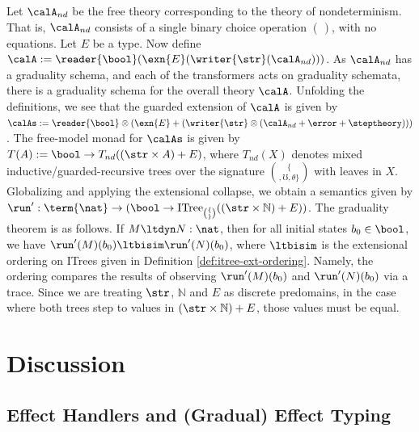 \documentclass[acmsmall,screen,review,anonymous]{acmart}
\theoremstyle{remark}
\begin{document}
\begin{example}\label{ex:multi-effects} Let $\calA_{nd}$ be the
free theory corresponding to the theory of nondeterminism. That is, $\calA_{nd}$
consists of a single binary choice operation $\choose$, with no equations. Let
$E$ be a type.
%
Now define $\calA := \reader{\bool}(\exn{E}(\writer{\str}(\calA_{nd})))$.
%
As $\calA_{nd}$ has a graduality schema, and each of the transformers acts on
graduality schemata, there is a graduality schema for the overall theory
$\calA$. Unfolding the definitions, we see that the guarded extension of $\calA$
is given by
%
$\calAs := \reader{\bool} \otimes (\exn{E} + (\writer{\str} \otimes (\calA_{nd} + \error + \steptheory)))$.
%
The free-model monad for $\calAs$ is given by
$T(A) := \bool \to T_{nd}((\str \times A) + E)$,
where $T_{nd}(X)$ denotes mixed inductive/guarded-recursive trees over the
signature $\{ \choose, \mho, \theta \}$ with leaves in $X$.
%
Globalizing and applying the extensional collapse, we obtain a semantics given by
$\run' : \term{\nat} \to (\bool \to \textrm{ITree}_{\{\choose\}}((\str \times \mathbb{N}) + E))$.
%
The graduality theorem is as follows. If $M \ltdyn N : \nat$, then for all
initial states $b_0 \in \bool$, we have $\run'(M)(b_0) \ltbisim \run'(N)(b_0)$,
where $\ltbisim$ is the extensional ordering on ITrees given in Definition
\ref{def:itree-ext-ordering}. Namely, the ordering compares the results of
observing $\run'(M)(b_0)$ and $\run'(N)(b_0)$ via a trace. Since we are treating
$\str$, $\mathbb{N}$ and $E$ as discrete predomains, in the case where both
trees step to values in $(\str \times \mathbb{N}) + E$, those values must be
equal.


\end{example}


\section{Discussion}\label{sec:discussion}

\subsection{Effect Handlers and (Gradual) Effect Typing}
\end{document}
